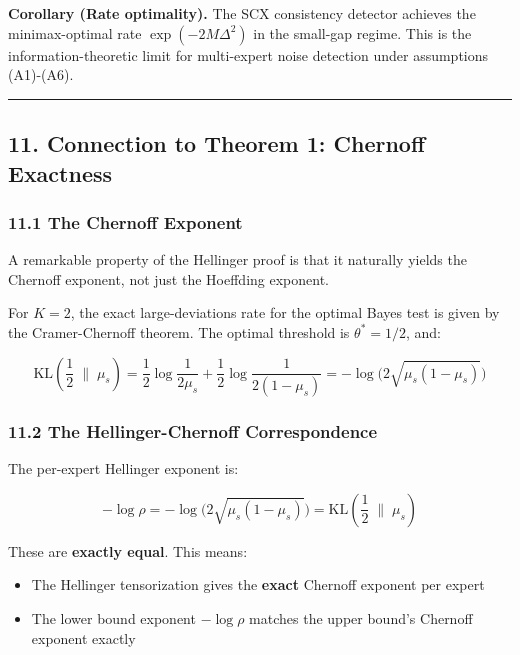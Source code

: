 \documentclass[
  12pt,
]{article}
\providecommand{\tightlist}{%
  \setlength{\itemsep}{0pt}\setlength{\parskip}{0pt}}
\begin{document}
\textbf{Corollary (Rate optimality).} The SCX consistency detector
achieves the minimax-optimal rate \(\exp(-2M\Delta^2)\) in the small-gap
regime. This is the information-theoretic limit for multi-expert noise
detection under assumptions (A1)-(A6).

\begin{center}\rule{0.5\linewidth}{0.5pt}\end{center}

\subsection{11. Connection to Theorem 1: Chernoff
Exactness}\label{connection-to-theorem-1-chernoff-exactness}

\subsubsection{11.1 The Chernoff Exponent}\label{the-chernoff-exponent}

A remarkable property of the Hellinger proof is that it naturally yields
the Chernoff exponent, not just the Hoeffding exponent.

For \(K=2\), the exact large-deviations rate for the optimal Bayes test
is given by the Cramer-Chernoff theorem. The optimal threshold is
\(\theta^* = 1/2\), and:

\[\text{KL}\!\left(\frac12 \;\Big\|\; \mu_s\right) = \frac12 \log\frac{1}{2\mu_s} + \frac12 \log\frac{1}{2(1-\mu_s)}
= -\log\bigl(2\sqrt{\mu_s(1-\mu_s)}\bigr)\]

\subsubsection{11.2 The Hellinger-Chernoff
Correspondence}\label{the-hellinger-chernoff-correspondence}

The per-expert Hellinger exponent is:

\[-\log \rho = -\log\bigl(2\sqrt{\mu_s(1-\mu_s)}\bigr) = \text{KL}\!\left(\frac12 \;\Big\|\; \mu_s\right)\]

These are \textbf{exactly equal}. This means:

\begin{itemize}
\tightlist
\item
  The Hellinger tensorization gives the \textbf{exact} Chernoff exponent
  per expert
\item
  The lower bound exponent \(-\log \rho\) matches the upper bound's
  Chernoff exponent exactly
\end{itemize}
\end{document}
